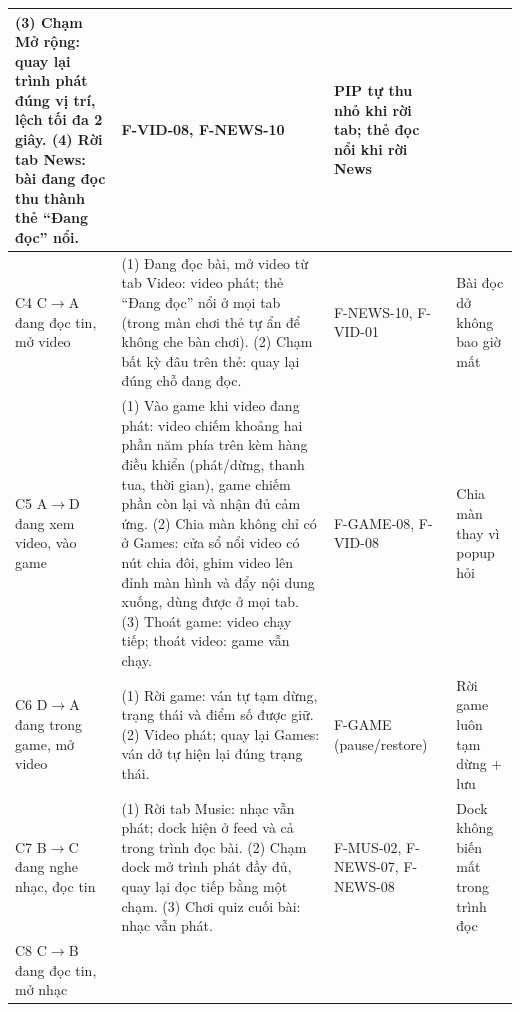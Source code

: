 \begin{longtable}{>{\raggedright\arraybackslash}p{1.5cm} >{\raggedright\arraybackslash}p{8.6cm} >{\raggedright\arraybackslash}p{2.5cm} >{\raggedright\arraybackslash}p{2.6cm}}
(3) Chạm Mở rộng: quay lại trình phát đúng vị trí, lệch tối đa 2 giây. \newline
(4) Rời tab News: bài đang đọc thu thành thẻ ``Đang đọc'' nổi. &
F-VID-08, F-NEWS-10 &
PIP tự thu nhỏ khi rời tab; thẻ đọc nổi khi rời News \\
\midrule
C4 \newline C$\rightarrow$A \newline đang đọc tin, mở video &
(1) Đang đọc bài, mở video từ tab Video: video phát; thẻ ``Đang đọc'' nổi ở mọi tab (trong màn chơi thẻ tự ẩn để không che bàn chơi). \newline
(2) Chạm bất kỳ đâu trên thẻ: quay lại đúng chỗ đang đọc. &
F-NEWS-10, F-VID-01 &
Bài đọc dở không bao giờ mất \\
\midrule
C5 \newline A$\rightarrow$D \newline đang xem video, vào game &
(1) Vào game khi video đang phát: video chiếm khoảng hai phần năm phía trên kèm hàng điều khiển (phát/dừng, thanh tua, thời gian), game chiếm phần còn lại và nhận đủ cảm ứng. \newline
(2) Chia màn không chỉ có ở Games: cửa sổ nổi video có nút chia đôi, ghim video lên đỉnh màn hình và đẩy nội dung xuống, dùng được ở mọi tab. \newline
(3) Thoát game: video chạy tiếp; thoát video: game vẫn chạy. &
F-GAME-08, F-VID-08 &
Chia màn thay vì popup hỏi \\
\midrule
C6 \newline D$\rightarrow$A \newline đang trong game, mở video &
(1) Rời game: ván tự tạm dừng, trạng thái và điểm số được giữ. \newline
(2) Video phát; quay lại Games: ván dở tự hiện lại đúng trạng thái. &
F-GAME (pause/restore) &
Rời game luôn tạm dừng + lưu \\
\midrule
C7 \newline B$\rightarrow$C \newline đang nghe nhạc, đọc tin &
(1) Rời tab Music: nhạc vẫn phát; dock hiện ở feed và cả trong trình đọc bài. \newline
(2) Chạm dock mở trình phát đầy đủ, quay lại đọc tiếp bằng một chạm. \newline
(3) Chơi quiz cuối bài: nhạc vẫn phát. &
F-MUS-02, F-NEWS-07, F-NEWS-08 &
Dock không biến mất trong trình đọc \\
\midrule
C8 \newline C$\rightarrow$B \newline đang đọc tin, mở nhạc &

\end{longtable}
